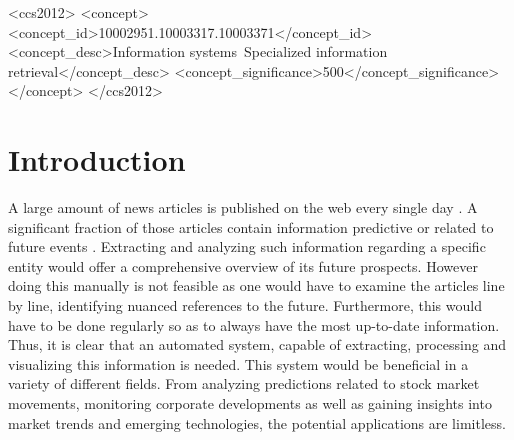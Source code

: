 \documentclass[sigconf]{acmart}
\begin{document}

\begin{CCSXML}
<ccs2012>
   <concept>
       <concept_id>10002951.10003317.10003371</concept_id>
       <concept_desc>Information systems~Specialized information retrieval</concept_desc>
<concept_significance>500</concept_significance>
       </concept>
 </ccs2012>
\end{CCSXML}





\maketitle


\section{Introduction}
A large amount of news articles is published on the web every single day \cite{numNewsArticles}. A significant fraction of those articles contain information predictive or related to future events \cite{analyzingCollective}. Extracting and analyzing such information regarding a specific entity would offer a comprehensive overview of its future prospects.
However doing this manually is not feasible as one would have to examine the articles line by line, identifying nuanced references to the future. Furthermore, this would have to be done regularly so as to always have the most up-to-date information. Thus, it is clear that an automated system, capable of extracting, processing and visualizing this information is needed. This system would be beneficial in a variety of different fields. From analyzing predictions related to stock market movements, monitoring corporate developments as well as gaining insights into market trends and emerging technologies, the potential applications are limitless.
\end{document}
